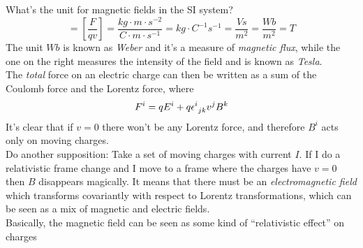 \documentclass[../electromagnetism]{subfiles}
\begin{document}
What's the unit for magnetic fields in the SI system?
\begin{equation}
	[B]=\left[ \frac{F}{qv} \right]=\unit{\frac{kg\cdot m\cdot s^{-2}}{C\cdot m\cdot s^{-1}}}=\unit{kg\cdot C^{-1}s^{-1}}=\unit{\frac{Vs}{m^2}}=\unit{\frac{Wb}{m^2}}=\unit{T}
	\label{eq:webertesla}
\end{equation}
The unit $\unit{Wb}$ is known as \textit{Weber} and it's a measure of \textit{magnetic flux}, while the one on the right measures the intensity of the field and is known as \textit{Tesla}.\\
The \textit{total} force on an electric charge can then be written as a sum of the Coulomb force and the Lorentz force, where
\begin{equation}
	F^i=qE^i+q\epsilon^{i}_{\ jk}v^jB^k
	\label{eq:totalforcecharge}
\end{equation}
It's clear that if $v=0$ there won't be any Lorentz force, and therefore $B^i$ acts only on moving charges.\\
Do another supposition: Take a set of moving charges with current $I$. If I do a relativistic frame change and I move to a frame where the charges have $v=0$ then $B$ disappears magically. It means that there must be an \textit{electromagnetic field} which transforms covariantly with respect to Lorentz transformations, which can be seen as a mix of magnetic and electric fields.\\
Basically, the magnetic field can be seen as some kind of ``relativistic effect'' on charges
\end{document}
